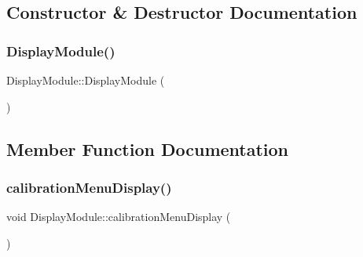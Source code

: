 \subsection{Constructor \& Destructor Documentation}
\mbox{\label{class_display_module_a6e39f0daba38d7d919ebece3e85c24b1}} 
\subsubsection{\texorpdfstring{Display\+Module()}{DisplayModule()}}
{\footnotesize\ttfamily Display\+Module\+::\+Display\+Module (\begin{DoxyParamCaption}{ }\end{DoxyParamCaption})}



\subsection{Member Function Documentation}
\mbox{\label{class_display_module_ae68c2f34985c276b559df3d7f4fafbbd}} 
\subsubsection{\texorpdfstring{calibration\+Menu\+Display()}{calibrationMenuDisplay()}}
{\footnotesize\ttfamily void Display\+Module\+::calibration\+Menu\+Display (\begin{DoxyParamCaption}{ }\end{DoxyParamCaption})}

